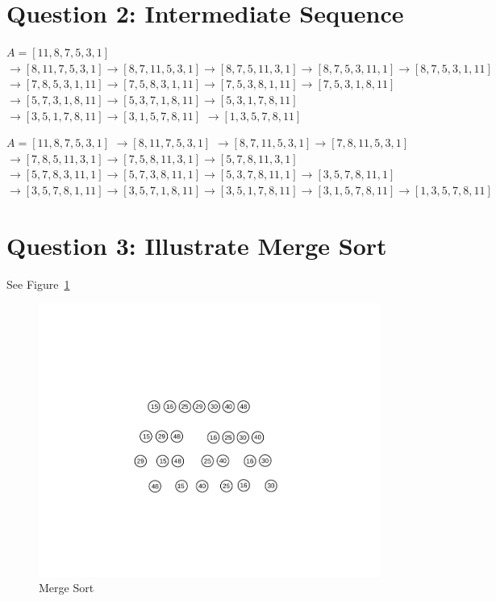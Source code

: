 \documentclass[]{article}
\begin{document}
\section{Question 2: Intermediate Sequence}

\begin{codebox}
	\li $A = [11, 8, 7, 5, 3, 1] $
	\li $\rightarrow [8, 11, 7, 5, 3, 1] \rightarrow [8, 7, 11, 5, 3, 1] \rightarrow [8, 7, 5, 11, 3, 1] 
	\rightarrow [8, 7, 5, 3, 11, 1] \rightarrow [8, 7, 5, 3, 1, 11]$
	\li $\rightarrow [7, 8, 5, 3, 1, 11] \rightarrow [7, 5, 8, 3, 1, 11] \rightarrow [7, 5, 3, 8, 1, 11]\rightarrow [7, 5, 3, 1, 8, 11]$
	\li $\rightarrow [5, 7, 3, 1, 8, 11] \rightarrow [5, 3, 7, 1, 8, 11] \rightarrow [5, 3, 1, 7, 8, 11]$	
	\li $\rightarrow [3, 5, 1, 7, 8, 11]\rightarrow [3, 1, 5, 7, 8, 11] $
	\li $\rightarrow [1, 3, 5, 7, 8, 11]$
\end{codebox}

\begin{codebox}
	\li $A = [11, 8, 7, 5, 3, 1] $
	\li $\rightarrow [8, 11, 7, 5, 3, 1]$
	\li $\rightarrow [8, 7, 11, 5, 3, 1] \rightarrow [7, 8, 11, 5, 3, 1]$
	\li $\rightarrow [7, 8, 5, 11, 3, 1] \rightarrow [7, 5, 8, 11, 3, 1] \rightarrow [5, 7, 8, 11, 3, 1]$
	\li $\rightarrow [5, 7, 8, 3, 11, 1] \rightarrow [5, 7, 3, 8, 11, 1] \rightarrow [5, 3, 7, 8, 11, 1] \rightarrow [3, 5, 7, 8, 11, 1]$
	\li $\rightarrow [3, 5, 7, 8, 1, 11] \rightarrow [3, 5, 7, 1, 8, 11] \rightarrow [3, 5, 1, 7, 8, 11] 
	\rightarrow [3, 1, 5, 7, 8, 11] \rightarrow [1, 3, 5, 7, 8, 11]$
\end{codebox}

\section{Question 3: Illustrate Merge Sort}

See Figure~\ref{fig:2ms}

\begin{figure}
	\centering
	\includegraphics[width=0.5\linewidth]{2_merge}
	\caption{Merge Sort}
	\label{fig:2ms}
\end{figure}
\end{document}
